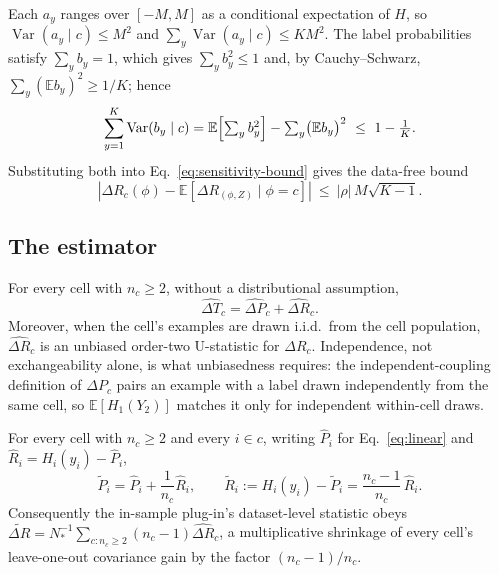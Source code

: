 \begin{corollary}\label{cor:sensitivity-crude}
Each $a_y$ ranges over $[-M,M]$ as a conditional expectation of $H$, so
$\operatorname{Var}(a_y\mid c)\le M^2$ and $\sum_y\operatorname{Var}(a_y\mid c)\le KM^2$.
The label probabilities satisfy $\sum_yb_y=1$, which gives $\sum_yb_y^2\le1$ and, by
Cauchy--Schwarz, $\sum_y(\mathbb E b_y)^2\ge1/K$; hence
\begin{equation}
\sum_{y=1}^K\operatorname{Var}(b_y\mid c)
=\mathbb E\Bigl[\textstyle\sum_yb_y^2\Bigr]-\sum_y\bigl(\mathbb E b_y\bigr)^2
\ \le\ 1-\frac1K .
\label{eq:simplex-var}
\end{equation}
Substituting both into Eq.~\eqref{eq:sensitivity-bound} gives the data-free bound
\begin{equation}
\left|\Delta R_c(\phi)-\mathbb E[\Delta R_{(\phi,Z)}\mid\phi=c]\right|
\ \le\ |\rho|\,M\sqrt{K-1}.
\label{eq:sensitivity-crude}
\end{equation}
\end{corollary}

\subsection{The estimator}
\begin{theorem}\label{thm:sample}
For every cell with $n_c\ge2$, without a distributional assumption,
\begin{equation}
\widehat{\Delta T}_c=\widehat{\Delta P}_c+\widehat{\Delta R}_c.
\end{equation}
Moreover, when the cell's examples are drawn i.i.d.\ from the cell population,
$\widehat{\Delta R}_c$ is an unbiased order-two U-statistic for $\Delta R_c$.
Independence, not exchangeability alone, is what unbiasedness requires: the
independent-coupling definition of $\Delta P_c$ pairs an example with a label drawn
independently from the same cell, so $\mathbb E[H_1(Y_2)]$ matches it only for
independent within-cell draws.
\end{theorem}

\begin{proposition}\label{prop:attenuate}
For every cell with $n_c\ge2$ and every $i\in c$, writing $\hat P_i$ for
Eq.~\eqref{eq:linear} and $\hat R_i=H_i(y_i)-\hat P_i$,
\begin{equation}
\tilde P_i=\hat P_i+\frac1{n_c}\hat R_i,
\qquad
\tilde R_i:=H_i(y_i)-\tilde P_i=\frac{n_c-1}{n_c}\,\hat R_i.
\label{eq:attenuation}
\end{equation}
Consequently the in-sample plug-in's dataset-level statistic obeys
$\widetilde{\Delta R}=N_*^{-1}\sum_{c:n_c\ge2}(n_c-1)\widehat{\Delta R}_c$, a
multiplicative shrinkage of every cell's leave-one-out covariance gain by the factor
$(n_c-1)/n_c$.
\end{proposition}

